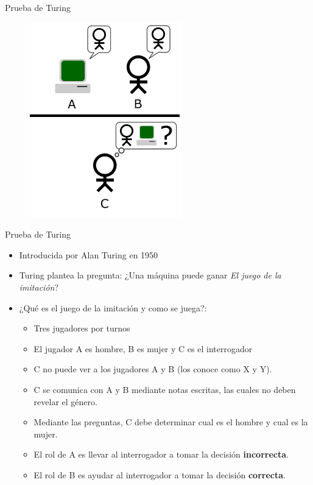 \documentclass[11pt,aspectratio=169]{beamer}
\begin{document}
\begin{frame}{Prueba de Turing}
    \begin{figure}
        \centering
        \includegraphics[scale=0.75]{img/Turing_Test_version_3.png}
    \end{figure}
\end{frame}

\begin{frame}{Prueba de Turing}
        \begin{itemize}
            \item Introducida por Alan Turing en 1950\cite{turing1} \pause 
            \item Turing plantea la pregunta: ¿Una máquina puede ganar 
                \textit{El juego de la imitación}?\pause
            \item ¿Qué es el juego de la imitación y como se juega?:\pause 
                \begin{itemize}
                    \item Tres jugadores por turnos \pause
                    \item El jugador A es hombre, B es mujer y C es el interrogador \pause
                    \item C no puede ver a los jugadores A y B (los conoce como X y Y). \pause
                    \item C se comunica con A y B mediante notas escritas, las cuales no deben
                        revelar el género.\pause
                    \item Mediante las preguntas, C debe determinar cual es el hombre
                        y cual es la mujer. \pause
                    \item El rol de A es llevar al interrogador a tomar la decisión \textbf{incorrecta}.\pause
                    \item El rol de B es ayudar al interrogador a tomar la decisión \textbf{correcta}.
                \end{itemize}
        \end{itemize}
\end{frame}
\end{document}
